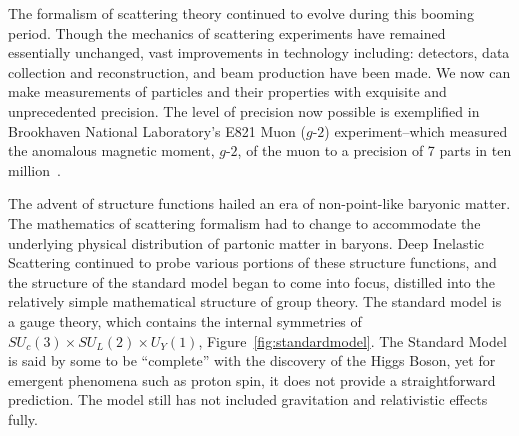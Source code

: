 The formalism of scattering theory continued to evolve during this booming
period.  Though the mechanics of scattering experiments have remained
essentially unchanged, vast improvements in technology including: detectors,
data collection and reconstruction, and beam production have been made. We now
can make measurements of particles and their properties with exquisite and
unprecedented precision. The level of precision now possible is exemplified in
Brookhaven National Laboratory's E821 Muon ($g$-$2$) experiment--which measured
the anomalous magnetic moment, $g$-$2$, of the muon to a precision of 7 parts in
ten million~\cite{Bennett}.

The advent of structure functions hailed an era of non-point-like baryonic
matter. The mathematics of scattering formalism had to change to accommodate the
underlying physical distribution of partonic matter in baryons. Deep Inelastic
Scattering continued to probe various portions of these structure functions, and
the structure of the standard model began to come into focus, distilled into the
relatively simple mathematical structure of group theory. The standard model is
a gauge theory, which contains the internal symmetries of $SU_{c}(3) \times
SU_{L}(2) \times U_{Y}(1)$, Figure~\ref{fig:standardmodel}.  The Standard Model
is said by some to be ``complete'' with the discovery of the Higgs Boson, yet
for emergent phenomena such as proton spin, it does not provide a
straightforward prediction. The model still has not included gravitation and
relativistic effects fully.

